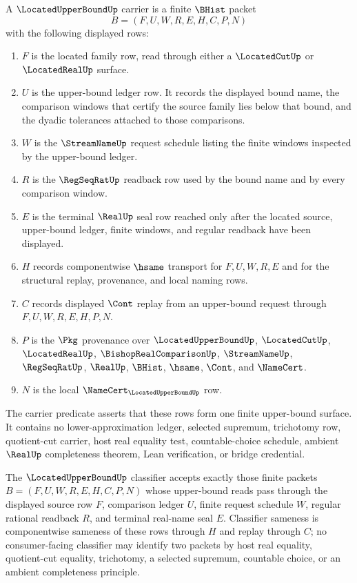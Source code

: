 \begin{definition}
\label{def:located-upper-bound-carrier}
A $\LocatedUpperBoundUp$ carrier is a finite $\BHist$ packet
$$
B=(F,U,W,R,E,H,C,P,N)
$$
with the following displayed rows:
\begin{enumerate}
\item $F$ is the located family row, read through either a $\LocatedCutUp$ or $\LocatedRealUp$ surface.
\item $U$ is the upper-bound ledger row. It records the displayed bound name, the comparison windows that certify the source family lies below that bound, and the dyadic tolerances attached to those comparisons.
\item $W$ is the $\StreamNameUp$ request schedule listing the finite windows inspected by the upper-bound ledger.
\item $R$ is the $\RegSeqRatUp$ readback row used by the bound name and by every comparison window.
\item $E$ is the terminal $\RealUp$ seal row reached only after the located source, upper-bound ledger, finite windows, and regular readback have been displayed.
\item $H$ records componentwise $\hsame$ transport for $F,U,W,R,E$ and for the structural replay, provenance, and local naming rows.
\item $C$ records displayed $\Cont$ replay from an upper-bound request through $F,U,W,R,E,H,P,N$.
\item $P$ is the $\Pkg$ provenance over $\LocatedUpperBoundUp$, $\LocatedCutUp$, $\LocatedRealUp$, $\BishopRealComparisonUp$, $\StreamNameUp$, $\RegSeqRatUp$, $\RealUp$, $\BHist$, $\hsame$, $\Cont$, and $\NameCert$.
\item $N$ is the local $\NameCert_{\LocatedUpperBoundUp}$ row.
\end{enumerate}
The carrier predicate asserts that these rows form one finite upper-bound surface. It contains no lower-approximation ledger, selected supremum, trichotomy row, quotient-cut carrier, host real equality test, countable-choice schedule, ambient $\RealUp$ completeness theorem, Lean verification, or bridge credential.
\end{definition}

\begin{definition}
\label{def:located-upper-bound-classifier}
The $\LocatedUpperBoundUp$ classifier accepts exactly those finite packets $B=(F,U,W,R,E,H,C,P,N)$ whose upper-bound reads pass through the displayed source row $F$, comparison ledger $U$, finite request schedule $W$, regular rational readback $R$, and terminal real-name seal $E$. Classifier sameness is componentwise sameness of these rows through $H$ and replay through $C$; no consumer-facing classifier may identify two packets by host real equality, quotient-cut equality, trichotomy, a selected supremum, countable choice, or an ambient completeness principle.
\end{definition}

